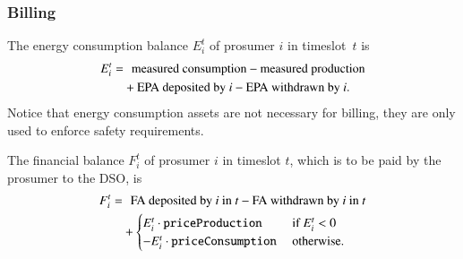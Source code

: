 \subsubsection{Billing}

The energy consumption balance $E_i^t$ of prosumer $i$ in timeslot~$t$ is
\begin{align*}
E_i^t = & \hphantom{+} \text{measured consumption} - \text{measured production} \\
 & + \text{EPA deposited by $i$} - \text{EPA withdrawn by $i$} .
\end{align*}
Notice that energy consumption assets are not necessary for billing, they are only used to enforce safety requirements.

The financial balance $F_i^t$ of prosumer $i$ in timeslot $t$, which is to be paid by the prosumer to the DSO, is
\begin{align*}
F_i^t = & \hphantom{+} \text{FA deposited by $i$ in $t$} - \text{FA withdrawn by $i$ in $t$} \\
 & + \begin{cases}
E_i^t \cdot \texttt{priceProduction} & \text{ if } E_i^t < 0 \\
- E_i^t \cdot \texttt{priceConsumption} & \text{ otherwise.} 
\end{cases}
\end{align*}


